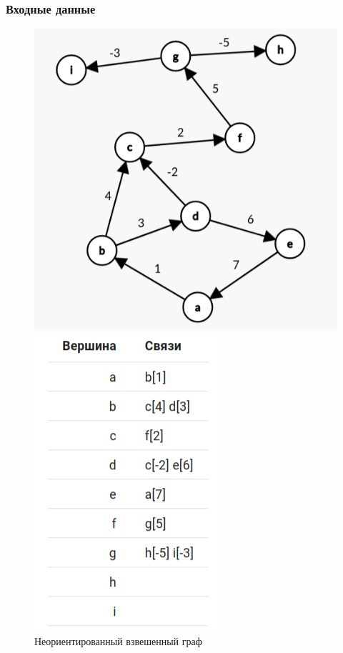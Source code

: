 \subsubsection{Входные данные}
\begin{figure}[H]
  \begin{minipage}{0.5\textwidth}
    \centering\includegraphics[width=0.8\linewidth]{figs/task-9/graph-9.png}
  \end{minipage}
  \begin{minipage}{0.5\textwidth}
    \centering\includegraphics[width=0.6\linewidth]{figs/task-9/adj-9.png}
  \end{minipage}
  \caption{Неориентированный взвешенный граф}
\end{figure}

